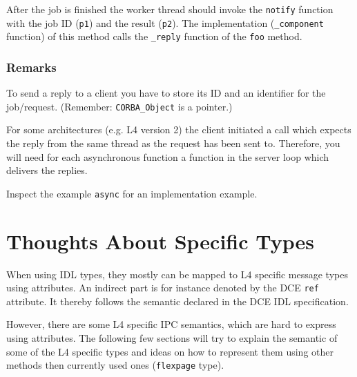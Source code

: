 After the job is finished the worker thread should invoke the \verb|notify| 
function with the job ID (\verb|p1|) and the result (\verb|p2|). The
implementation (\verb|_component| function) of this method calls the \verb|_reply|
function of the \verb|foo| method.

\subsubsection{Remarks}
To send a reply to a client you have to store its ID and an identifier
for the job/request. (Remember: \verb|CORBA_Object| is a pointer.)

For some architectures (e.g. L4 version 2) the client initiated a
call which expects the reply from the same thread as the request
has been sent to. Therefore, you will need for each asynchronous function
a function in the server loop which delivers the replies.

Inspect the example \verb|async| for an implementation example.

\section{Thoughts About \dice{} Specific Types}
When using IDL types, they mostly can be mapped to L4 specific 
message types using attributes. An indirect part is for 
instance denoted by the DCE \verb|ref| attribute. It thereby
follows the semantic declared in the DCE IDL specification.

However, there are some L4 specific IPC semantics, which
are hard to express using attributes. The following few
sections will try to explain the semantic of some of the L4
specific types and ideas on how to represent them using other 
methods then currently used ones ({\tt flexpage} type).

